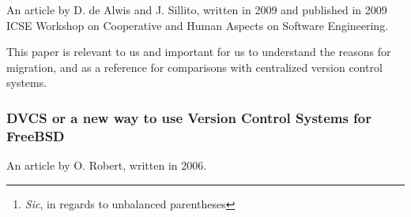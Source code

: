 \documentclass{article}
\begin{document}
An article by D. de Alwis and J. Sillito, written in 2009 and published in 
2009 ICSE Workshop on Cooperative and Human Aspects on Software
Engineering\cite{alwis09}.

\begin{abstract}
 Version control systems are essential for co-ordinating work on a software
 project. A number of open- and closed-source projects are proposing to
 move, or have already moved, their source code repositories from a
 centralized version control system (CVCS) to a decentralized version
 control system (DVCS). In this paper we summarize the differences between a
 CVCS and a DVCS, and describe some of the rationales and perceived benefits
 offered by projects to justify the transition.
\end{abstract}

This paper is relevant to us and important for us to understand the reasons
for migration, and as a reference for comparisons with centralized version 
control systems.

\subsubsection{DVCS or a new way to use Version Control Systems for FreeBSD}

An article by O. Robert, written in 2006\cite{robert06}.

\begin{abstract}
 FreeBSD, like many open source projects, uses CVS as its main versioon
 control system (VCS), which is an extended history of all modifications
 made since the beginning of the project in 1993. CVS is a cornerstone of
 FreeBSD in two ways: not only does it record the history of the project,
 but it is a fundamental tool for coordinating the development of the
 FreeBSD operating system.

 CVS is built around the concept of centralised repository, which has a
 number of limitations.

 Recently, a new type of VCS has arisen: Distributed VCS, one of the first
 being BK from BitMover, Inc. Better known from the controversy it generated
 when Linus Torvalds started using it, it has nonetheless changed the way
 some people develop software.

 This paper explores the area of distributed VCS. We analyse two of them
 (Arch in its Bazaar incarnation and Mercuriel and try to show how such a
 tool could help further FreeBSD development, both as a tool and as a new
 development process.\footnote{
  \emph{Sic}, in regards to unbalanced parentheses
 }
\end{abstract}
\end{document}
